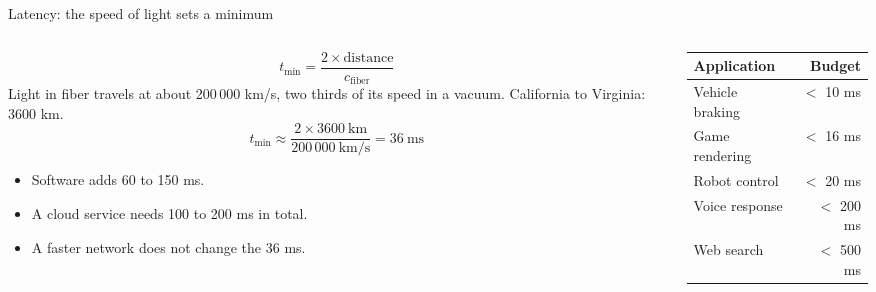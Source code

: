 \begin{frame}{Latency: the speed of light sets a minimum}
  \begin{columns}[T]
    \begin{column}{0.56\textwidth}
      \[
        t_{\min} = \frac{2 \times \text{distance}}{c_{\text{fiber}}}
      \]
      Light in fiber travels at about 200\,000 km/s, two thirds of its speed
      in a vacuum. California to Virginia: 3600 km.
      \[
        t_{\min} \approx \frac{2 \times 3600\ \text{km}}{200\,000\ \text{km/s}}
                 = 36\ \text{ms}
      \]
      \begin{itemize}
        \item Software adds 60 to 150 ms.
        \item A cloud service needs 100 to 200 ms in total.
        \item A faster network does not change the 36 ms.
      \end{itemize}
    \end{column}
    \begin{column}{0.40\textwidth}
      \small
      \renewcommand{\arraystretch}{1.2}
      \begin{tabular}{@{}lr@{}}
        \toprule
        \textbf{Application} & \textbf{Budget} \\
        \midrule
        Vehicle braking & $<$ 10 ms \\
        Game rendering  & $<$ 16 ms \\
        Robot control   & $<$ 20 ms \\
        Voice response  & $<$ 200 ms \\
        Web search      & $<$ 500 ms \\
        \bottomrule
      \end{tabular}
    \end{column}
  \end{columns}
\end{frame}

